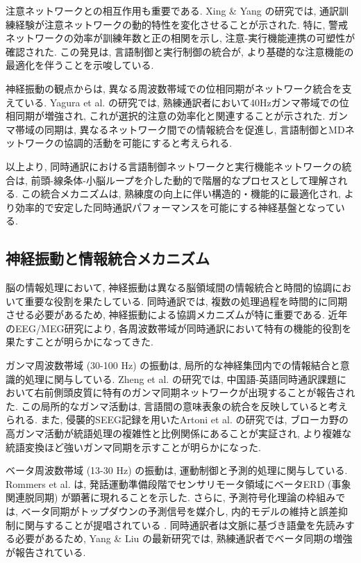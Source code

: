 注意ネットワークとの相互作用も重要である.
Xing \& Yang \cite{Xing2023} の研究では, 通訳訓練経験が注意ネットワークの動的特性を変化させることが示された.
特に, 警戒ネットワークの効率が訓練年数と正の相関を示し, 注意-実行機能連携の可塑性が確認された.
この発見は, 言語制御と実行制御の統合が, より基礎的な注意機能の最適化を伴うことを示唆している.

神経振動の観点からは, 異なる周波数帯域での位相同期がネットワーク統合を支えている.
Yagura et al. \cite{yagura2021selective} の研究では, 熟練通訳者において40Hzガンマ帯域での位相同期が増強され, これが選択的注意の効率化と関連することが示された.
ガンマ帯域の同期は, 異なるネットワーク間での情報統合を促進し, 言語制御とMDネットワークの協調的活動を可能にすると考えられる.

以上より, 同時通訳における言語制御ネットワークと実行機能ネットワークの統合は, 前頭-線条体-小脳ループを介した動的で階層的なプロセスとして理解される.
この統合メカニズムは, 熟練度の向上に伴い構造的・機能的に最適化され, より効率的で安定した同時通訳パフォーマンスを可能にする神経基盤となっている.

\subsection{神経振動と情報統合メカニズム}

脳の情報処理において, 神経振動は異なる脳領域間の情報統合と時間的協調において重要な役割を果たしている.
同時通訳では, 複数の処理過程を時間的に同期させる必要があるため, 神経振動による協調メカニズムが特に重要である.
近年のEEG/MEG研究により, 各周波数帯域が同時通訳において特有の機能的役割を果たすことが明らかになってきた.

ガンマ周波数帯域 (30-100 Hz) の振動は, 局所的な神経集団内での情報結合と意識的処理に関与している.
Zheng et al. \cite{zheng2022} の研究では, 中国語-英語同時通訳課題において右前側頭皮質に特有のガンマ同期ネットワークが出現することが報告された.
この局所的なガンマ活動は, 言語間の意味表象の統合を反映していると考えられる.
また, 侵襲的SEEG記録を用いたArtoni et al. \cite{artoni2020} の研究では, ブローカ野の高ガンマ活動が統語処理の複雑性と比例関係にあることが実証され, より複雑な統語変換ほど強いガンマ同期を示すことが明らかになった.

ベータ周波数帯域 (13-30 Hz) の振動は, 運動制御と予測的処理に関与している.
Rommers et al. \cite{rommers2019} は, 発話運動準備段階でセンサリモータ領域にベータERD (事象関連脱同期) が顕著に現れることを示した.
さらに, 予測符号化理論の枠組みでは, ベータ同期がトップダウンの予測信号を媒介し, 内的モデルの維持と誤差抑制に関与することが提唱されている \cite{arnal2012,lewis2016}.
同時通訳者は文脈に基づき語彙を先読みする必要があるため, Yang & Liu \cite{load2024} の最新研究では, 熟練通訳者でベータ同期の増強が報告されている.

